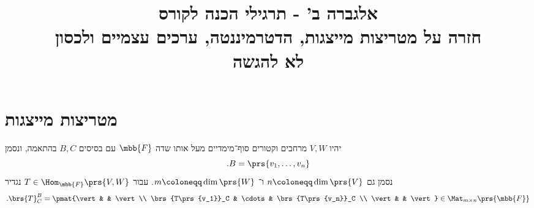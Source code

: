 \documentclass[a4paper,10pt,twoside,openany]{article}
\title{
אלגברה ב' - תרגילי הכנה לקורס \\
חזרה על מטריצות מייצגות, הדטרמיננטה, ערכים עצמיים ולכסון
\\
\vspace{1cm}
\large{לא להגשה}
}
\date{}
\begin{document}
\maketitle

\section{מטריצות מייצגות}

\begin{definition}
יהיו
$V,W$
מרחבים וקטורים סוף־מימדיים מעל אותו שדה
$\mbb{F}$
עם בסיסים
$B,C$
בהתאמה, ונסמן
\[\text{.} B = \prs{v_1, \ldots, v_n}\]
נסמן גם
$n \coloneqq \dim\prs{V}$
ו־%
$m \coloneqq \dim\prs{W}$.
עבור
$T \in \Hom_{\mbb{F}}\prs{V,W}$
נגדיר
\[\text{.} \brs{T}^B_C = \pmat{\vert & & \vert \\ \brs{T\prs{v_1}}_C & \cdots & \brs{T\prs{v_n}}_C \\ \vert & & \vert} \in \Mat_{m \times n}\prs{\mbb{F}}\]
\end{definition}
\end{document}
